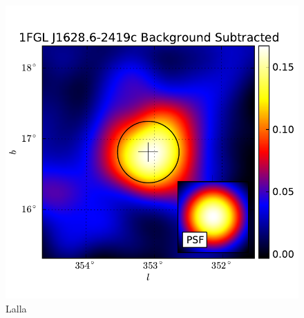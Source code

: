 \documentclass{emulateapj}
\begin{document}
  \begin{figure}
    \begin{center}
      \includegraphics[type=pdf,ext=.pdf,read=.pdf]{source_plots/source_1FGL_J1628.6-2419c}
    \end{center}
    \caption{Lalla}
  \end{figure}
\end{document}
